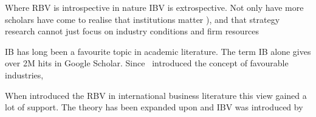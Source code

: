 Where \gls{RBV}  is introspective in nature \gls{IBV} is extrospective. Not only have   more scholars have come to realise that institutions matter \cite{Powell:1991}  \cite{Scott:1995}), and that strategy research cannot just focus on industry conditions and firm resources



\Gls{IB} has long been a favourite topic in academic literature. The term \gls{IB} alone gives over 2M hits in Google Scholar. Since~\cite{Porter:1980} introduced the concept of favourable industries, 

When introduced the \gls{RBV} in international business literature this view gained a lot of support. 
The theory has been expanded upon and \gls{IBV} was introduced by \cite{Kostova:1999,Meyer:2009,Wang:2012}